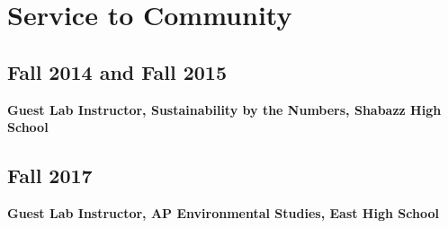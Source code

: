\documentclass{article}
\begin{document}
\section*{Service to Community}
\label{sec:orgee2340a}
\subsection*{Fall 2014 and Fall 2015}
\label{sec:orgd445271}
\textbf{Guest Lab Instructor, Sustainability by the Numbers, Shabazz High School}

\subsection*{Fall 2017}
\label{sec:org9d92609}
\textbf{Guest Lab Instructor, AP Environmental Studies, East High School}
\end{document}
